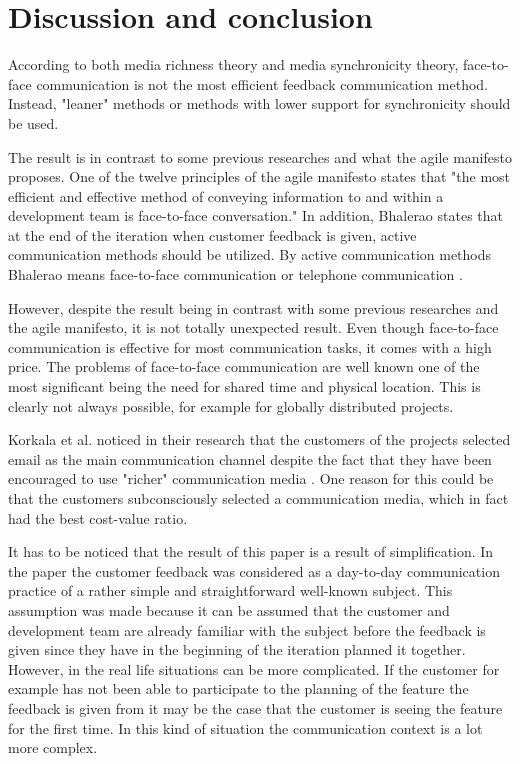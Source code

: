 \documentclass[conference]{IEEEtran}
\begin{document}
\section{Discussion and conclusion}

According to both media richness theory and media synchronicity theory, face-to-face communication is not the most efficient feedback communication method. Instead, "leaner" methods or methods with lower support for synchronicity should be used.

The result is in contrast to some previous researches and what the agile manifesto proposes. One of the twelve principles of the agile manifesto states that "the most efficient and effective method of conveying information to and within a development team is face-to-face conversation." \cite{agilemanifesto} In addition, Bhalerao states that at the end of the iteration when customer feedback is given, active communication methods should be utilized. By active communication methods Bhalerao means face-to-face communication or telephone communication \cite{2010bhalerao}.

However, despite the result being in contrast with some previous researches and the agile manifesto, it is not totally unexpected result. Even though face-to-face communication is effective for most communication tasks, it comes with a high price. The problems of face-to-face communication are well known one of the most significant being the need for shared time and physical location. This is clearly not always possible, for example for globally distributed projects.

Korkala et al. noticed in their research that the customers of the projects selected email as the main communication channel despite the fact that they have been encouraged to use "richer" communication media \cite{2006korkala}. One reason for this could be that the customers subconsciously selected a communication media, which in fact had the best cost-value ratio.

It has to be noticed that the result of this paper is a result of simplification. In the paper the customer feedback was considered as a day-to-day communication practice of a rather simple and straightforward well-known subject. This assumption was made because it can be assumed that the customer and development team are already familiar with the subject before the feedback is given since they have in the beginning of the iteration planned it together. However, in the real life situations can be more complicated. If the customer for example has not been able to participate to the planning of the feature the feedback is given from it may be the case that the customer is seeing the feature for the first time. In this kind of situation the communication context is a lot more complex.
\end{document}
